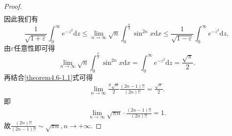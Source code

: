 \documentclass[../../main.tex]{subfiles}%
\begin{document}
\begin{proof}
\begin{align*}
\end{align*}
因此我们有
\[
\frac{1}{\sqrt{1 + \varepsilon}}\int_{0}^{\infty}e^{-z^{2}}\mathrm{d}z\leqslant\lim_{n\rightarrow\infty}\sqrt{n}\int_{0}^{\frac{\pi}{2}}\sin^{2n}x \mathrm{d}x\leqslant\frac{1}{\sqrt{1 - \varepsilon}}\int_{0}^{\infty}e^{-z^{2}}\mathrm{d}z,
\]
由\(\varepsilon\)任意性即可得
\[
\lim_{n\rightarrow\infty}\sqrt{n}\int_{0}^{\frac{\pi}{2}}\sin^{2n}x \mathrm{d}x=\int_{0}^{\infty}e^{-z^{2}}\mathrm{d}z=\frac{\sqrt{\pi}}{2}.
\]
再结合\eqref{theorem4.6-1.1}式可得
\begin{align*}
\lim_{n\rightarrow \infty} \frac{\pi \sqrt{n}}{2}\frac{(2n-1)!!}{(2n)!!}=\frac{\sqrt{\pi}}{2}.
\end{align*}
即
\begin{align*}
\lim_{n\rightarrow \infty} \sqrt{\pi n}\cdot \frac{(2n-1)!!}{(2n)!!}=1.
\end{align*}
故$\frac{(2n)!!}{(2n-1)!!}\sim \sqrt{\pi n},n\rightarrow +\infty $.
\end{proof}
\end{document}

